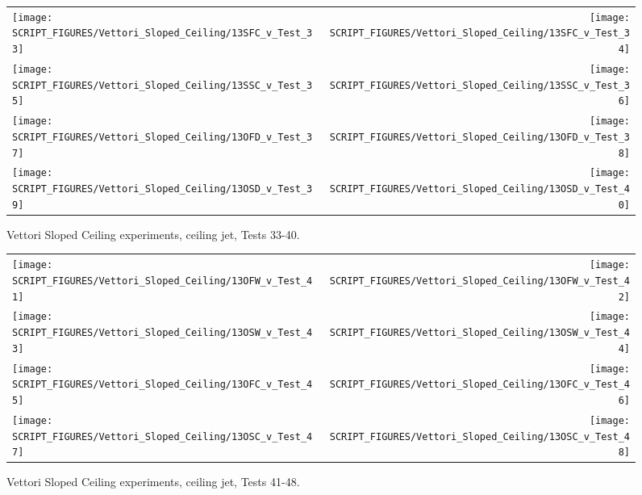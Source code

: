 \begin{figure}[p]
\begin{tabular*}{\textwidth}{l@{\extracolsep{\fill}}r}
\texttt{[image: SCRIPT\_FIGURES/Vettori\_Sloped\_Ceiling/13SFC\_v\_Test\_33]} &
\texttt{[image: SCRIPT\_FIGURES/Vettori\_Sloped\_Ceiling/13SFC\_v\_Test\_34]} \\
\texttt{[image: SCRIPT\_FIGURES/Vettori\_Sloped\_Ceiling/13SSC\_v\_Test\_35]} &
\texttt{[image: SCRIPT\_FIGURES/Vettori\_Sloped\_Ceiling/13SSC\_v\_Test\_36]} \\
\texttt{[image: SCRIPT\_FIGURES/Vettori\_Sloped\_Ceiling/13OFD\_v\_Test\_37]} &
\texttt{[image: SCRIPT\_FIGURES/Vettori\_Sloped\_Ceiling/13OFD\_v\_Test\_38]} \\
\texttt{[image: SCRIPT\_FIGURES/Vettori\_Sloped\_Ceiling/13OSD\_v\_Test\_39]} &
\texttt{[image: SCRIPT\_FIGURES/Vettori\_Sloped\_Ceiling/13OSD\_v\_Test\_40]} \\
\end{tabular*}
\caption[Vettori Sloped Ceiling experiments, ceiling jet, Tests 33-40]{Vettori Sloped Ceiling experiments, ceiling jet, Tests 33-40.}
\label{Vettori_Sloped_5}
\end{figure}

\begin{figure}[p]
\begin{tabular*}{\textwidth}{l@{\extracolsep{\fill}}r}
\texttt{[image: SCRIPT\_FIGURES/Vettori\_Sloped\_Ceiling/13OFW\_v\_Test\_41]} &
\texttt{[image: SCRIPT\_FIGURES/Vettori\_Sloped\_Ceiling/13OFW\_v\_Test\_42]} \\
\texttt{[image: SCRIPT\_FIGURES/Vettori\_Sloped\_Ceiling/13OSW\_v\_Test\_43]} &
\texttt{[image: SCRIPT\_FIGURES/Vettori\_Sloped\_Ceiling/13OSW\_v\_Test\_44]} \\
\texttt{[image: SCRIPT\_FIGURES/Vettori\_Sloped\_Ceiling/13OFC\_v\_Test\_45]} &
\texttt{[image: SCRIPT\_FIGURES/Vettori\_Sloped\_Ceiling/13OFC\_v\_Test\_46]} \\
\texttt{[image: SCRIPT\_FIGURES/Vettori\_Sloped\_Ceiling/13OSC\_v\_Test\_47]} &
\texttt{[image: SCRIPT\_FIGURES/Vettori\_Sloped\_Ceiling/13OSC\_v\_Test\_48]} \\
\end{tabular*}
\caption[Vettori Sloped Ceiling experiments, ceiling jet, Tests 41-48]{Vettori Sloped Ceiling experiments, ceiling jet, Tests 41-48.}
\label{Vettori_Sloped_6}
\end{figure}

